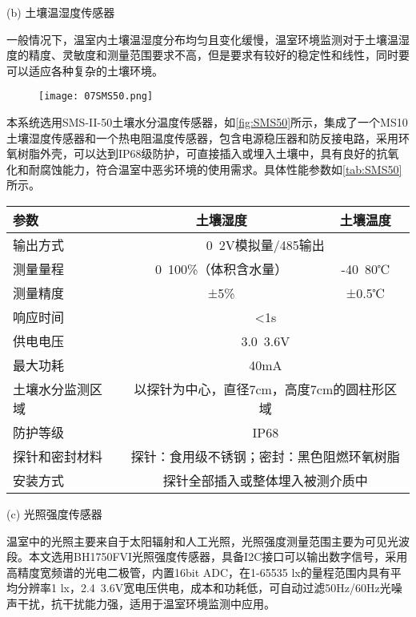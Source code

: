 		(b) 土壤温湿度传感器
		
		一般情况下，温室内土壤温湿度分布均匀且变化缓慢，温室环境监测对于土壤温湿度的精度、灵敏度和测量范围要求不高，但是要求有较好的稳定性和线性，同时要可以适应各种复杂的土壤环境。
  		\begin{figure}[!htp]
  			\centering
 			\texttt{[image: 07SMS50.png]}
		\end{figure}
		本系统选用SMS-II-50土壤水分温度传感器，如\ref{fig:SMS50}所示，集成了一个MS10土壤湿度传感器和一个热电阻温度传感器，包含电源稳压器和防反接电路，采用环氧树脂外壳，可以达到IP68级防护，可直接插入或埋入土壤中，具有良好的抗氧化和耐腐蚀能力，符合温室中恶劣环境的使用需求。具体性能参数如\ref{tab:SMS50}所示。		
		\begin{table}[!hpb]
  			\centering
  			\begin{tabular}{lcc} \toprule
    		参数 & 土壤湿度 & 土壤温度 \\ \midrule
    		输出方式 & \multicolumn{2}{c}{0~2V模拟量/485输出} \\
    		测量量程 & 0~100\%（体积含水量） & -40~80℃\\
			测量精度 & ±5\% & ±0.5℃\\
    		响应时间 & \multicolumn{2}{c}{<1s} \\
    		供电电压 & \multicolumn{2}{c}{3.0~3.6V} \\
    		最大功耗 & \multicolumn{2}{c}{40mA} \\
    		土壤水分监测区域 & \multicolumn{2}{c}{以探针为中心，直径7cm，高度7cm的圆柱形区域} \\
    		防护等级 & \multicolumn{2}{c}{IP68} \\
    		探针和密封材料 & \multicolumn{2}{c}{探针：食用级不锈钢；密封：黑色阻燃环氧树脂} \\
    		安装方式 & \multicolumn{2}{c}{探针全部插入或整体埋入被测介质中} \\ \bottomrule
 			\end{tabular}
		\end{table}
		(c) 光照强度传感器
		
温室中的光照主要来自于太阳辐射和人工光照，光照强度测量范围主要为可见光波段。本文选用BH1750FVI光照强度传感器，具备I2C接口可以输出数字信号，采用高精度宽频谱的光电二极管，内置16bit ADC，在1-65535 lx的量程范围内具有平均分辨率1 lx，2.4~3.6V宽电压供电，成本和功耗低，可自动过滤50Hz/60Hz光噪声干扰，抗干扰能力强，适用于温室环境监测中应用。

